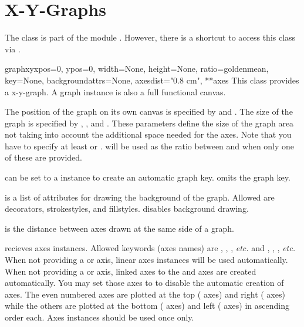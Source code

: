 \section{X-Y-Graphs\label{graph:graph}}


The class  is part of the module .
However, there is a shortcut to access this class via
.

\begin{classdesc}{graphxy}{xpos=0, ypos=0, width=None, height=None,
ratio=goldenmean, key=None, backgroundattrs=None, axesdist="0.8 cm",
**axes}
  This class provides a x-y-graph. A graph instance is also a full
  functional canvas.

  The position of the graph on its own canvas is specified by
   and . The size of the graph is specified by
  , , and . These parameters define
  the size of the graph area not taking into account the additional
  space needed for the axes. Note that you have to specify at least
   or .  will be used as the ratio
  between  and  when only one of these are
  provided.

   can be set to a  instance to create
  an automatic graph key.  omits the graph key.

   is a list of attributes for drawing the
  background of the graph. Allowed are decorators, strokestyles, and
  fillstyles.  disables background drawing.

   is the distance between axes drawn at the same side
  of a graph.

   recieves axes instances. Allowed keywords (axes names)
  are , , , \emph{etc.} and ,
  , , \emph{etc.} When not providing a  or
   axis, linear axes instances will be used automatically.
  When not providing a  or  axis, linked axes to the
   and  axes are created automatically. You may set
  those axes to  to disable the automatic creation of axes.
  The even numbered axes are plotted at the top ( axes) and
  right ( axes) while the others are plotted at the bottom
  ( axes) and left ( axes) in ascending order each.
  Axes instances should be used once only.
\end{classdesc}

